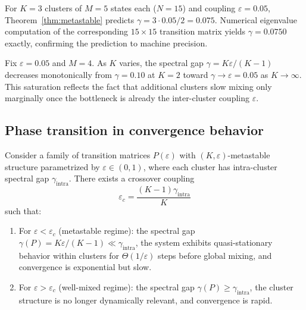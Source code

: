 \begin{example}\label{ex:three}
For $K = 3$ clusters of $M = 5$ states each ($N = 15$) and coupling
$\varepsilon = 0.05$, Theorem~\ref{thm:metastable} predicts
$\gamma = 3 \cdot 0.05 / 2 = 0.075$. Numerical eigenvalue computation of the
corresponding $15 \times 15$ transition matrix yields $\gamma = 0.0750$ exactly,
confirming the prediction to machine precision.
\end{example}

\begin{example}[Dependence on $K$]\label{ex:K_scaling}
Fix $\varepsilon = 0.05$ and $M = 4$. As $K$ varies, the spectral gap
$\gamma = K\varepsilon/(K-1)$ decreases monotonically from
$\gamma = 0.10$ at $K = 2$ toward $\gamma \to \varepsilon = 0.05$ as
$K \to \infty$. This saturation reflects the fact that additional clusters
slow mixing only marginally once the bottleneck is already the inter-cluster
coupling $\varepsilon$.
\end{example}

\subsection{Phase transition in convergence behavior}

\begin{theorem}\label{thm:phase}
Consider a family of transition matrices $P(\varepsilon)$ with
$(K, \varepsilon)$-metastable structure parametrized by
$\varepsilon \in (0, 1)$, where each cluster has intra-cluster spectral gap
$\gamma_{\mathrm{intra}}$. There exists a crossover coupling
\begin{equation}\label{eq:eps_c}
  \varepsilon_c = \frac{(K-1) \gamma_{\mathrm{intra}}}{K}
\end{equation}
such that:
\begin{enumerate}[label=(\roman*)]
\item For $\varepsilon < \varepsilon_c$ (metastable regime): the spectral gap
  $\gamma(P) = K\varepsilon/(K-1) \ll \gamma_{\mathrm{intra}}$, the system
  exhibits quasi-stationary behavior within clusters for
  $\Theta(1/\varepsilon)$ steps before global mixing, and convergence is
  exponential but slow.
\item For $\varepsilon > \varepsilon_c$ (well-mixed regime): the spectral gap
  $\gamma(P) \ge \gamma_{\mathrm{intra}}$, the cluster structure is no longer
  dynamically relevant, and convergence is rapid.
\end{enumerate}
\end{theorem}

